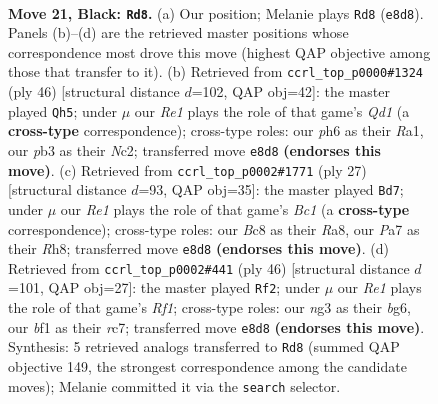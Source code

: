 \documentclass[11pt]{article}
\begin{document}
\begin{figure}[p]
\label{fig:thought-m39}
\end{figure}

\clearpage

\begin{figure}[p]\centering
\begin{subfigure}{0.46\textwidth}\centering
\resizebox{\linewidth}{!}{%
\newchessgame
\chessboard[
  setfen={rnb1rk2/p2qb2p/1pp3pP/3p1pP1/P2P1P2/1P2P1N1/8/R2QKBNR b KQ - 12 21},
  showmover=false,
  pgfstyle=straightmove, color=movearrow, markmove={e8-d8}
]}
\caption{}
\end{subfigure}\hfill
\begin{subfigure}{0.46\textwidth}\centering
\resizebox{\linewidth}{!}{%
\newchessgame
\chessboard[
  setfen={3q2rk/p2b1ppn/2np3p/1rp1pP2/4P2P/1P1P2P1/P1NB1RB1/R2Q2K1 w - - 0 24},
  showmover=false,
  pgfstyle=straightmove, color=movearrow, markmove={d1-h5}
]}
\caption{}
\end{subfigure}
\\[4pt]
\begin{subfigure}{0.46\textwidth}\centering
\resizebox{\linewidth}{!}{%
\newchessgame
\chessboard[
  setfen={r1b1k2r/1pq1bppp/p1npp3/6PP/P3P3/1PN1BP2/1P6/R2QKB1R b KQkq - 0 14},
  showmover=false,
  pgfstyle=straightmove, color=movearrow, markmove={c8-d7}
]}
\caption{}
\end{subfigure}\hfill
\begin{subfigure}{0.46\textwidth}\centering
\resizebox{\linewidth}{!}{%
\newchessgame
\chessboard[
  setfen={4k2r/2rqnpp1/p3p1b1/1pp1P3/3p2P1/1P1P1B2/P1P1Q3/R1B2RK1 w k - 1 24},
  showmover=false,
  pgfstyle=straightmove, color=movearrow, markmove={f1-f2}
]}
\caption{}
\end{subfigure}
\caption{\textbf{Move 21, Black: \texttt{Rd8}.} (a) Our position; Melanie plays \texttt{Rd8} (\texttt{e8d8}). Panels (b)--(d) are the retrieved master positions whose correspondence most drove this move (highest QAP objective among those that transfer to it). (b) Retrieved from \texttt{ccrl\_top\_p0000\#1324} (ply 46) [structural distance $d$=102, QAP obj=42]: the master played \texttt{Qh5}; under $\mu$ our \emph{Re1} plays the role of that game's \emph{Qd1} (a \textbf{cross-type} correspondence); cross-type roles: our \emph{p}h6 as their \emph{R}a1, our \emph{p}b3 as their \emph{N}c2; transferred move \texttt{e8d8} \textbf{(endorses this move)}. (c) Retrieved from \texttt{ccrl\_top\_p0002\#1771} (ply 27) [structural distance $d$=93, QAP obj=35]: the master played \texttt{Bd7}; under $\mu$ our \emph{Re1} plays the role of that game's \emph{Bc1} (a \textbf{cross-type} correspondence); cross-type roles: our \emph{B}c8 as their \emph{R}a8, our \emph{P}a7 as their \emph{R}h8; transferred move \texttt{e8d8} \textbf{(endorses this move)}. (d) Retrieved from \texttt{ccrl\_top\_p0002\#441} (ply 46) [structural distance $d$=101, QAP obj=27]: the master played \texttt{Rf2}; under $\mu$ our \emph{Re1} plays the role of that game's \emph{Rf1}; cross-type roles: our \emph{n}g3 as their \emph{b}g6, our \emph{b}f1 as their \emph{r}c7; transferred move \texttt{e8d8} \textbf{(endorses this move)}. Synthesis: 5 retrieved analogs transferred to \texttt{Rd8} (summed QAP objective 149, the strongest correspondence among the candidate moves); Melanie committed it via the \texttt{search} selector.}

\end{figure}
\end{document}
